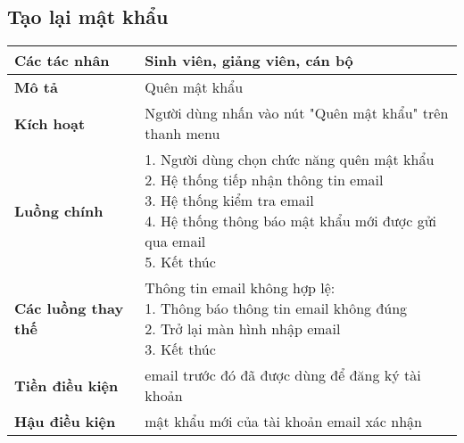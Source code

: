 \subsection*{Tạo lại mật khẩu}
	\begin{tabular}{|l|p{}|}
		\hline
		\textbf{Các tác nhân}         & Sinh viên, giảng viên, cán bộ                            \\
		\hline
		\textbf{Mô tả}                & Quên mật khẩu                                           \\
		\hline
		\textbf{Kích hoạt}            & Người dùng nhấn vào nút "Quên mật khẩu" trên thanh menu \\
		\hline
		\textbf{Luồng chính}           & \makecell[l]{1. Người dùng chọn chức năng quên mật khẩu \\ 2. Hệ thống tiếp nhận thông tin email \\ 3. Hệ thống kiểm tra email \\ 4. Hệ thống thông báo mật khẩu mới được gửi qua email \\ 5. Kết thúc} \\
		\hline
		\textbf{Các luồng thay thế}   & \makecell[l]{Thông tin email không hợp lệ:              \\ 1. Thông báo thông tin email không đúng \\ 2. Trở lại màn hình nhập email \\ 3. Kết thúc} \\
		\hline
		\textbf{Tiền điều kiện}       & email trước đó đã được dùng để đăng ký tài khoản        \\
		\hline
		\textbf{Hậu điều kiện}        & mật khẩu mới của tài khoản email xác nhận               \\
		\hline
	\end{tabular}

